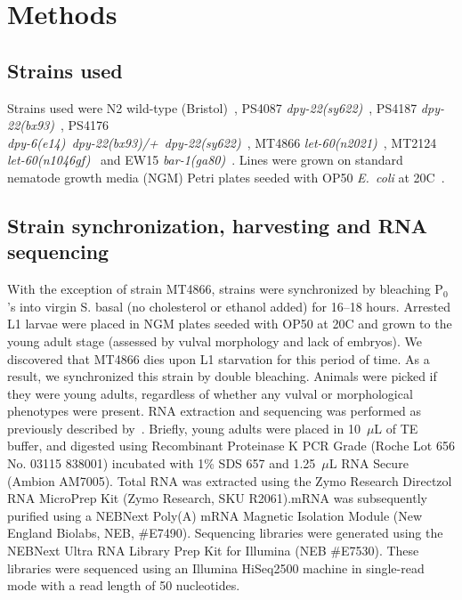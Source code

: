 \documentclass[9pt,twocolumn,twoside]{gsajnl}
\newcommand{\ecol}{\emph{E.~coli}}
\newcommand{\gene}[1]{\mbox{\emph{#1}}}
\newcommand{\dpy}[1]{\gene{dpy-22#1}}
\newcommand{\bx}{\dpy{(bx93)}}
\newcommand{\sy}{\dpy{(sy622)}}
\begin{document}
\section*{Methods}\label{sec:methods}

\subsection*{Strains used}
Strains used were N2 wild-type (Bristol)~\citep{Brenner1974},
PS4087 \sy{}~\citep{Moghal2003},
PS4187 \bx{}~\citep{Zhang2000},
PS4176\\ \gene{dpy-6(e14) dpy-22(bx93)/+ dpy-22(sy622)}~\citep{Moghal2003},
MT4866 \gene{let-60(n2021)}~\citep{Beitel1990a},
MT2124 \gene{let-60(n1046gf)}~\citep{Beitel1990a} and
EW15 \gene{bar-1(ga80)}~\citep{Eisenmann1998}.
Lines were grown on standard nematode growth media (NGM) Petri plates seeded
with OP50 \ecol{} at 20\degree{}C~\citep{Brenner1974}.

\subsection*{Strain synchronization, harvesting and RNA sequencing}
With the exception of strain MT4866, strains were synchronized by bleaching
P$_0$'s into virgin S. basal (no cholesterol or ethanol added) for 16--18 hours.
Arrested L1 larvae were placed in NGM plates seeded with OP50 at 20\degree{}C
and grown to the young adult stage (assessed by vulval morphology and lack of
embryos). We discovered that MT4866 dies upon L1 starvation for this period of
time. As a result, we synchronized this strain by double bleaching. Animals were
picked if they were young adults, regardless of whether any vulval or
morphological phenotypes were present. RNA extraction and sequencing was
performed as previously described by~\citet{AngelesAlboresHIF,
Angeles-Albores2017}. Briefly, young adults were placed in 10~$\mu$L of TE
buffer,  and digested using  Recombinant Proteinase K PCR Grade (Roche Lot 656
No. 03115 838001) incubated with 1\% SDS 657 and 1.25~$\mu$L RNA Secure (Ambion
AM7005). Total RNA was extracted using the Zymo Research Directzol RNA MicroPrep
Kit (Zymo Research, SKU R2061).\@ mRNA was subsequently purified using a NEBNext
Poly(A) mRNA Magnetic Isolation Module (New England Biolabs, NEB, \#E7490).
Sequencing libraries were generated using the NEBNext Ultra RNA Library Prep Kit
for Illumina (NEB \#E7530). These libraries were sequenced using an Illumina
HiSeq2500 machine in single-read mode with a read length of 50 nucleotides.
\end{document}
